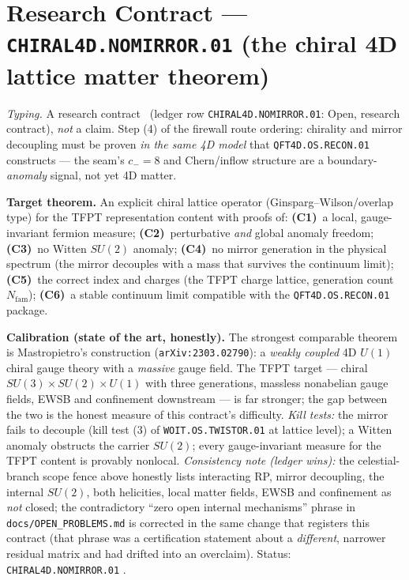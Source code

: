 \documentclass[11pt,a4paper]{article}
\newcommand{\Nfam}{N_{\mathrm{fam}}}
\begin{document}
\section*{Research Contract --- \texttt{CHIRAL4D.NOMIRROR.01} (the chiral 4D lattice matter theorem)}
\noindent\emph{Typing.} A research contract \mO\ (ledger row \texttt{CHIRAL4D.NOMIRROR.01}:
Open, research contract), \emph{not} a claim.  Step (4) of the firewall route ordering: chirality
and mirror decoupling must be proven \emph{in the same 4D model} that
\texttt{QFT4D.OS.RECON.01} constructs --- the seam's $c_-{=}8$ and Chern/inflow structure are a
boundary-\emph{anomaly} signal, not yet 4D matter.

\par\smallskip\noindent\textbf{Target theorem.}  An explicit chiral lattice operator
(Ginsparg--Wilson/overlap type) for the TFPT representation content with proofs of:
\textbf{(C1)}~a local, gauge-invariant fermion measure; \textbf{(C2)}~perturbative \emph{and}
global anomaly freedom; \textbf{(C3)}~no Witten $SU(2)$ anomaly; \textbf{(C4)}~no mirror
generation in the physical spectrum (the mirror decouples with a mass that survives the
continuum limit); \textbf{(C5)}~the correct index and charges (the TFPT charge lattice,
generation count $\Nfam$); \textbf{(C6)}~a stable continuum limit compatible with the
\texttt{QFT4D.OS.RECON.01} package.

\par\smallskip\noindent\textbf{Calibration (state of the art, honestly).}  The strongest
comparable theorem is Mastropietro's construction (\texttt{arXiv:2303.02790}): a \emph{weakly
coupled} 4D $U(1)$ chiral gauge theory with a \emph{massive} gauge field.  The TFPT target ---
chiral $SU(3){\times}SU(2){\times}U(1)$ with three generations, massless nonabelian gauge
fields, EWSB and confinement downstream --- is far stronger; the gap between the two is the
honest measure of this contract's difficulty.  \emph{Kill tests:} the mirror fails to decouple
(kill test (3) of \texttt{WOIT.OS.TWISTOR.01} at lattice level); a Witten anomaly obstructs the
carrier $SU(2)$; every gauge-invariant measure for the TFPT content is provably nonlocal.
\emph{Consistency note (ledger wins):} the celestial-branch scope fence above honestly lists
interacting RP, mirror decoupling, the internal $SU(2)$, both helicities, local matter fields,
EWSB and confinement as \emph{not} closed; the contradictory ``zero open internal mechanisms''
phrase in \texttt{docs/OPEN\_PROBLEMS.md} is corrected in the same change that registers this
contract (that phrase was a certification statement about a \emph{different}, narrower residual
matrix and had drifted into an overclaim).  Status: \texttt{CHIRAL4D.NOMIRROR.01} \mO.
\end{document}
